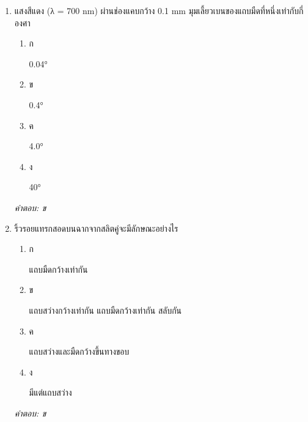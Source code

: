 \documentclass[12pt]{article}
\begin{document}
\begin{enumerate}[label=\arabic*., itemsep=0.5\baselineskip, topsep=0.5\baselineskip, leftmargin=*]
\item แสงสีแดง (λ = 700 nm) ผ่านช่องแคบกว้าง 0.1 mm มุมเลี้ยวเบนของแถบมืดที่หนึ่งเท่ากับกี่องศา
\begin{enumerate}[label=\alph*)., itemsep=0.3\baselineskip, topsep=0.3\baselineskip]
\item ก\ 
\begin{minipage}[t]{0.9\linewidth}
\raggedright 0.04°
\end{minipage}
\item ข\ 
\begin{minipage}[t]{0.9\linewidth}
\raggedright 0.4°
\end{minipage}
\item ค\ 
\begin{minipage}[t]{0.9\linewidth}
\raggedright 4.0°
\end{minipage}
\item ง\ 
\begin{minipage}[t]{0.9\linewidth}
\raggedright 40°
\end{minipage}
\end{enumerate}
\vspace{-0.3\baselineskip}
\begin{small}
\textit{คำตอบ: ข}
\end{small}

\item ริ้วรอยแทรกสอดบนฉากจากสลิตคู่จะมีลักษณะอย่างไร
\begin{enumerate}[label=\alph*)., itemsep=0.3\baselineskip, topsep=0.3\baselineskip]
\item ก\ 
\begin{minipage}[t]{0.9\linewidth}
\raggedright แถบมืดกว้างเท่ากัน
\end{minipage}
\item ข\ 
\begin{minipage}[t]{0.9\linewidth}
\raggedright แถบสว่างกว้างเท่ากัน แถบมืดกว้างเท่ากัน สลับกัน
\end{minipage}
\item ค\ 
\begin{minipage}[t]{0.9\linewidth}
\raggedright แถบสว่างและมืดกว้างขึ้นทางขอบ
\end{minipage}
\item ง\ 
\begin{minipage}[t]{0.9\linewidth}
\raggedright มีแต่แถบสว่าง
\end{minipage}
\end{enumerate}
\vspace{-0.3\baselineskip}
\begin{small}
\textit{คำตอบ: ข}
\end{small}


\end{enumerate}
\end{document}
